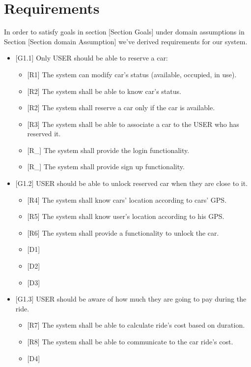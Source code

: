 
\section{Requirements}

In order to satisfy goals in section {[}Section Goals{]} under domain
assumptions in Section {[}Section domain Assumption{]} we've derived
requirements for our system.
\begin{itemize}
\item {[}G1.1{]} Only USER should be able to reserve a car:
\begin{itemize}
\item {[}R1{]} The system can modify car's status (available, occupied,
in use).
\item {[}R2{]} The system shall be able to know car's status.
\item {[}R2{]} The system shall reserve a car only if the car is available. 
\item {[}R3{]} The system shall be able to associate a car to the USER who
has reserved it. 
\item {[}R\_{]} The system shall provide the login functionality.
\item {[}R\_{]} The system shall provide sign up functionality.
\end{itemize}
\item {[}G1.2{]} USER should be able to unlock reserved car when they are
close to it.
\begin{itemize}
\item {[}R4{]} The system shall know cars' location according to cars' GPS.
\item {[}R5{]} The system shall know user's location according to his GPS.
\item {[}R6{]} The system shall provide a functionality to unlock the car. 
\item {[}D1{]}
\item {[}D2{]}
\item {[}D3{]}
\end{itemize}
\item {[}G1.3{]} USER should be aware of how much they are going to pay
during the ride.
\begin{itemize}
\item {[}R7{]} The system shall be able to calculate ride's cost based on
duration.
\item {[}R8{]} The system shall be able to communicate to the car ride's
cost.
\item {[}D4{]}
\end{itemize}

\end{itemize}
